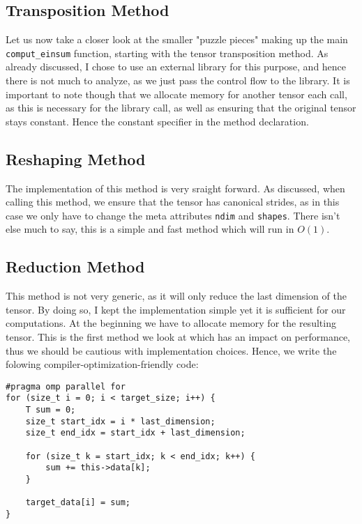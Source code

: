 \documentclass[sigconf]{acmart}
\begin{document}
\subsection{Transposition Method}
Let us now take a closer look at the smaller "puzzle pieces" making up the main \texttt{comput\_einsum} function, starting with the tensor transposition method. As already discussed, I chose to use an external library for this purpose, and hence there is not much to analyze, as we just pass the control flow to the library. It is important to note though that we allocate memory for another tensor each call, as this is necessary for the library call, as well as ensuring that the original tensor stays constant. Hence the constant specifier in the method declaration.

\subsection{Reshaping Method}
The implementation of this method is very sraight forward. As discussed, when calling this method, we ensure that the tensor has canonical strides, as in this case we only have to change the meta attributes \texttt{ndim} and \texttt{shapes}. There isn't else much to say, this is a simple and fast method which will run in $O(1)$.

\subsection{Reduction Method}
This method is not very generic, as it will only reduce the last dimension of the tensor. By doing so, I kept the implementation simple yet it is sufficient for our computations. At the beginning we have to allocate memory for the resulting tensor. This is the first method we look at which has an impact on performance, thus we should be cautious with implementation choices. Hence, we write the folowing compiler-optimization-friendly code:

\begin{verbatim}
#pragma omp parallel for
for (size_t i = 0; i < target_size; i++) {
    T sum = 0;
    size_t start_idx = i * last_dimension;
    size_t end_idx = start_idx + last_dimension;

    for (size_t k = start_idx; k < end_idx; k++) {
        sum += this->data[k];
    }
    
    target_data[i] = sum;
}
\end{verbatim}
\end{document}
